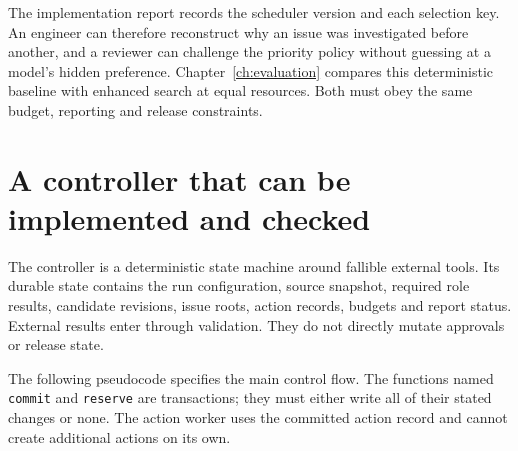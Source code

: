 The implementation report records the scheduler version and each selection key.
An engineer can therefore reconstruct why an issue was investigated before
another, and a reviewer can challenge the priority policy without guessing at a
model's hidden preference. Chapter~\ref{ch:evaluation} compares this deterministic
baseline with enhanced search at equal resources. Both must obey the same budget,
reporting and release constraints.

\section{A controller that can be implemented and checked}

The controller is a deterministic state machine around fallible external tools.
Its durable state contains the run configuration, source snapshot, required role
results, candidate revisions, issue roots, action records, budgets and report
status. External results enter through validation. They do not directly mutate
approvals or release state.

The following pseudocode specifies the main control flow. The functions named
\texttt{commit} and \texttt{reserve} are transactions; they must either write all
of their stated changes or none. The action worker uses the committed action
record and cannot create additional actions on its own.

